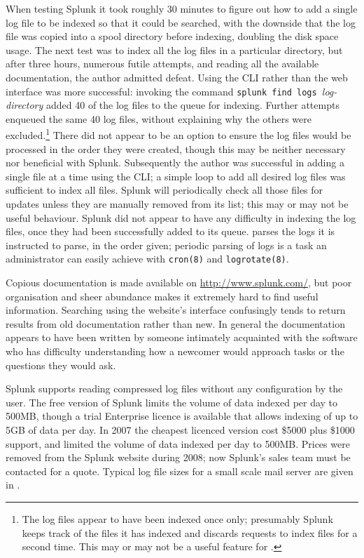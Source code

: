 When testing Splunk it took roughly 30 minutes to figure out how to add a
single log file to be indexed so that it could be searched, with the
downside that the log file was copied into a spool directory before
indexing, doubling the disk space usage.  The next test was to index all
the log files in a particular directory, but after three hours, numerous
futile attempts, and reading all the available documentation, the author
admitted defeat.  Using the \gls{CLI} rather than the web interface was
more successful: invoking the command \newline{} \tab{} \texttt{splunk find
logs }\textit{log-directory\/}\newline{} added 40 of the
\numberOFlogFILES{} log files to the queue for indexing.  Further attempts
enqueued the same 40 log files, without explaining why the others were
excluded.\footnote{The log files appear to have been indexed once only;
presumably Splunk keeps track of the files it has indexed and discards
requests to index files for a second time.  This may or may not be a useful
feature for \parsername{}.} There did not appear to be an option to ensure
the log files would be processed in the order they were created, though
this may be neither necessary nor beneficial with Splunk.  Subsequently the
author was successful in adding a single file at a time using the
\gls{CLI}; a simple loop to add all desired log files was sufficient to
index all files.  Splunk will periodically check all those files for
updates unless they are manually removed from its list; this may or may not
be useful behaviour.  Splunk did not appear to have any difficulty in
indexing the log files, once they had been successfully added to its queue.
\parsername{} parses the logs it is instructed to parse, in the order
given; periodic parsing of logs is a task an administrator can easily
achieve with \texttt{cron(8)} and \texttt{logrotate(8)}.

Copious documentation is made available on \url{http://www.splunk.com/},
but poor organisation and sheer abundance makes it extremely hard to find
useful information.  Searching using the website's interface confusingly
tends to return results from old documentation rather than new.  In general
the documentation appears to have been written by someone intimately
acquainted with the software who has difficulty understanding how a
newcomer would approach tasks or the questions they would ask.

Splunk supports reading compressed log files without any configuration by
the user.  The free version of Splunk limits the volume of data indexed per
day to 500MB, though a trial Enterprise licence is available that allows
indexing of up to 5GB of data per day.  In 2007 the cheapest licenced
version cost \$5000 plus \$1000 support, and limited the volume of data
indexed per day to 500MB\@.  Prices were removed from the Splunk website
during 2008; now Splunk's sales team must be contacted for a quote.
Typical log file sizes for a small scale mail server are given in
.

